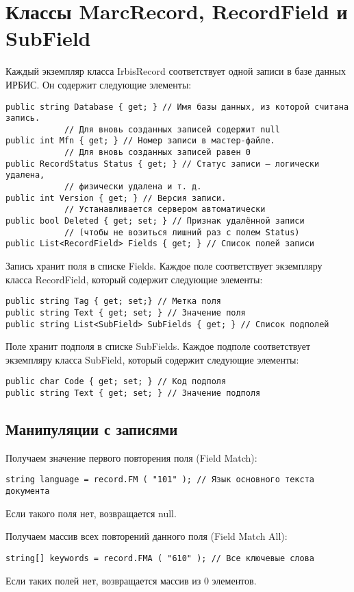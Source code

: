\section{Классы MarcRecord, RecordField и SubField}

Каждый экземпляр класса IrbisRecord соответствует одной записи в базе данных ИРБИС. Он содержит следующие элементы:
\begin{lstlisting}
public string Database { get; } // Имя базы данных, из которой считана запись. 
			// Для вновь созданных записей содержит null
public int Mfn { get; } // Номер записи в мастер-файле.
			// Для вновь созданных записей равен 0
public RecordStatus Status { get; } // Статус записи – логически удалена, 
			// физически удалена и т. д.
public int Version { get; } // Версия записи. 
			// Устанавливается сервером автоматически
public bool Deleted { get; set; } // Признак удалённой записи
			// (чтобы не возиться лишний раз с полем Status)
public List<RecordField> Fields { get; } // Список полей записи
\end{lstlisting}
Запись хранит поля в списке Fields. Каждое поле соответствует экземпляру класса RecordField, который содержит следующие элементы:
\begin{lstlisting}
public string Tag { get; set;} // Метка поля
public string Text { get; set; } // Значение поля
public string List<SubField> SubFields { get; } // Список подполей
\end{lstlisting}
Поле хранит подполя в списке SubFields. Каждое подполе соответствует экземпляру класса SubField, который содержит следующие элементы:
\begin{lstlisting}
public char Code { get; set; } // Код подполя
public string Text { get; set; } // Значение подполя
\end{lstlisting}
\subsection{Манипуляции с записями}

Получаем значение первого повторения поля (Field Match):
\begin{lstlisting}
string language = record.FM ( "101" ); // Язык основного текста документа
\end{lstlisting}
Если такого поля нет, возвращается null.

Получаем массив всех повторений данного поля (Field Match All):
\begin{lstlisting}
string[] keywords = record.FMA ( "610" ); // Все ключевые слова
\end{lstlisting}
Если таких полей нет, возвращается массив из 0 элементов. 

